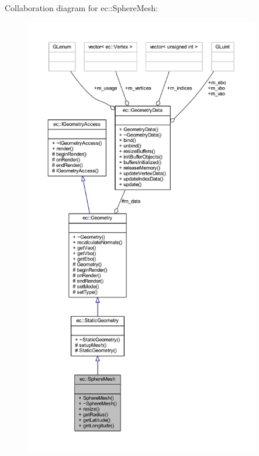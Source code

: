 Collaboration diagram for ec\+:\+:Sphere\+Mesh\+:\nopagebreak
\begin{figure}[H]
\begin{center}
\leavevmode
\includegraphics[height=550pt]{classec_1_1_sphere_mesh__coll__graph}
\end{center}
\end{figure}
